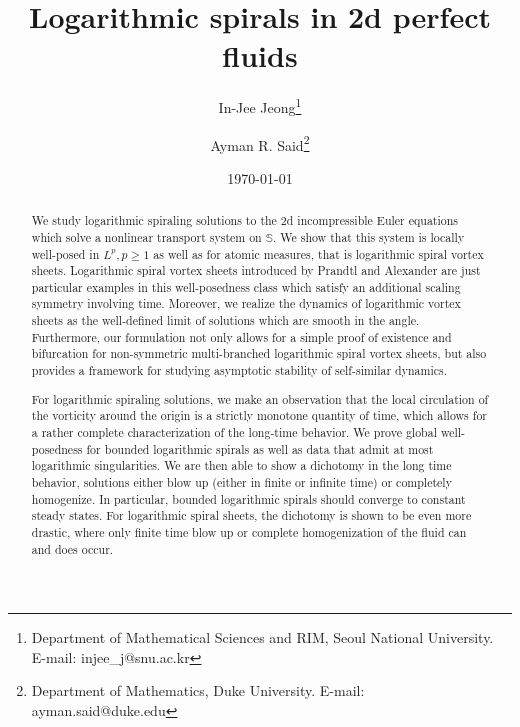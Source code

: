 \documentclass[10pt]{article}
\theoremstyle{definition}
\theoremstyle{remark}
\numberwithin{equation}{section}
\newcommand{\0}{\emptyset}
\begin{document}
	
	
	\title{Logarithmic spirals in 2d perfect fluids}
	\author{In-Jee Jeong\thanks{Department of Mathematical Sciences and RIM, Seoul National University.   E-mail: injee\_j@snu.ac.kr}  \and Ayman R. Said\thanks{Department of Mathematics, Duke University.   E-mail: ayman.said@duke.edu} }
	
	\date\today
	
	\maketitle
	
	\renewcommand{\thefootnote}{\fnsymbol{footnote}}
	\renewcommand{\thefootnote}{\arabic{footnote}}
	
	
	\begin{abstract} 
		We study logarithmic spiraling solutions to the 2d incompressible Euler equations which solve a nonlinear transport system on $\mathbb{S}$. We show that this system is locally well-posed in $L^p, p\geq 1$ as well as for atomic measures, that is logarithmic spiral vortex sheets. Logarithmic spiral vortex sheets introduced by Prandtl and Alexander are just particular examples in this well-posedness class which satisfy an additional scaling symmetry involving time. Moreover, we realize the dynamics of logarithmic vortex sheets as the well-defined limit of solutions which are smooth in the angle. Furthermore, our formulation not only allows for a simple proof of existence and bifurcation for non-symmetric multi-branched logarithmic spiral vortex sheets, but also provides a framework for studying asymptotic stability of self-similar dynamics. 

        For logarithmic spiraling solutions, we make an observation that the local circulation of the vorticity around the origin is a strictly monotone quantity of time, which allows for a rather complete characterization of the long-time behavior. We prove global well-posedness for bounded logarithmic spirals as well as data that admit at most logarithmic singularities. We are then able to show a dichotomy in the long time behavior, solutions either blow up (either in finite or infinite time) or completely homogenize. In particular, bounded logarithmic spirals should converge to constant steady states. For logarithmic spiral sheets, the dichotomy is shown to be even more drastic, where only finite time blow up or complete homogenization of the fluid can and does occur.
	\end{abstract}
	
\end{document}
